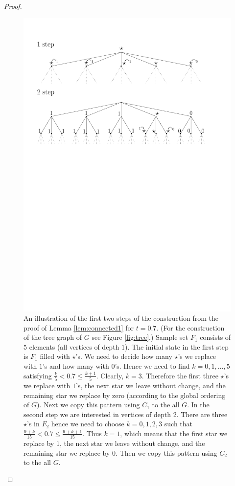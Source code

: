 \begin{proof}
\begin{figure}
\centering
\includegraphics[scale=0.85]{Graphics/toeplitz_path_tree}
\caption{An illustration of the first two steps of the construction from the proof of Lemma \ref{lem:connected1} for $t=0.7$. (For the construction of the tree graph of $G$ see Figure \ref{fig:tree}.) Sample set $F_{1}$ consists of $5$ elements (all vertices of depth $1$). The initial state in the first step is $F_1$ filled with $\star$'s. We need to decide how many $\star$'s we replace with $1$'s and how many with $0$'s. Hence we need to find  $k=0,1,\ldots, 5$ satisfying $\frac{k}{5}< 0.7 \leq \frac{k+1}{5}$. Clearly, $k=3$. Therefore the first three $\star$'s we replace with $1$'s, the next star we leave without change, and  the remaining star we replace by zero (according to the global ordering of $G$). Next we copy this pattern using $C_1$  to the all $G$. In the second step we are interested in vertices of depth $2$. There are three $\star$'s in $F_{2}$ hence we need to choose $k=0,1,2,3$ such that $\frac{9+k}{15}< 0.7 \leq \frac{9+k+1}{15}$. Thus $k=1$, which means that the first star we replace by $1$, the next star we leave without change, and  the remaining star we replace by $0$. Then we copy this pattern using $C_2$ to the all $G$. }\label{fig:path_connect_Toeplitz}
\end{figure}




\end{proof}
